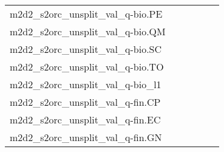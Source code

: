 {\begin{longtable}{m{6cm}m{1.7cm}m{1.7cm}m{1.7cm}m{1.7cm}m{1.7cm}}
	m2d2\_s2orc\_unsplit\_val\_q-bio.PE  & \colorbox[HTML]{bae294}{\makebox[\mywidth][c]{12.57}} & \colorbox[HTML]{dcf1a5}{\makebox[\mywidth][c]{12.71}} & \colorbox[HTML]{ffffe5}{\makebox[\mywidth][c]{14.62}} & \colorbox[HTML]{d7efa2}{\makebox[\mywidth][c]{12.69}} & \colorbox[HTML]{77c578}{\makebox[\mywidth][c]{12.41}}\\
	m2d2\_s2orc\_unsplit\_val\_q-bio.QM  & \colorbox[HTML]{a4d98a}{\makebox[\mywidth][c]{12.49}} & \colorbox[HTML]{ddf1a6}{\makebox[\mywidth][c]{12.69}} & \colorbox[HTML]{ffffe5}{\makebox[\mywidth][c]{14.44}} & \colorbox[HTML]{bbe395}{\makebox[\mywidth][c]{12.56}} & \colorbox[HTML]{77c578}{\makebox[\mywidth][c]{12.40}}\\
	m2d2\_s2orc\_unsplit\_val\_q-bio.SC  & \colorbox[HTML]{b8e293}{\makebox[\mywidth][c]{13.68}} & \colorbox[HTML]{e1f3a9}{\makebox[\mywidth][c]{13.85}} & \colorbox[HTML]{ffffe5}{\makebox[\mywidth][c]{15.60}} & \colorbox[HTML]{cdeb9d}{\makebox[\mywidth][c]{13.75}} & \colorbox[HTML]{77c578}{\makebox[\mywidth][c]{13.53}}\\
	m2d2\_s2orc\_unsplit\_val\_q-bio.TO  & \colorbox[HTML]{bde395}{\makebox[\mywidth][c]{13.49}} & \colorbox[HTML]{cae99c}{\makebox[\mywidth][c]{13.53}} & \colorbox[HTML]{ffffe5}{\makebox[\mywidth][c]{15.32}} & \colorbox[HTML]{bbe395}{\makebox[\mywidth][c]{13.48}} & \colorbox[HTML]{77c578}{\makebox[\mywidth][c]{13.33}}\\
	m2d2\_s2orc\_unsplit\_val\_q-bio\_l1  & \colorbox[HTML]{bfe596}{\makebox[\mywidth][c]{13.69}} & \colorbox[HTML]{e4f4ab}{\makebox[\mywidth][c]{13.87}} & \colorbox[HTML]{ffffe5}{\makebox[\mywidth][c]{15.75}} & \colorbox[HTML]{cdeb9d}{\makebox[\mywidth][c]{13.75}} & \colorbox[HTML]{77c578}{\makebox[\mywidth][c]{13.50}}\\
	m2d2\_s2orc\_unsplit\_val\_q-fin.CP  & \colorbox[HTML]{a2d889}{\makebox[\mywidth][c]{11.37}} & \colorbox[HTML]{e3f4aa}{\makebox[\mywidth][c]{11.61}} & \colorbox[HTML]{ffffe5}{\makebox[\mywidth][c]{13.36}} & \colorbox[HTML]{b2df90}{\makebox[\mywidth][c]{11.41}} & \colorbox[HTML]{77c578}{\makebox[\mywidth][c]{11.28}}\\
	m2d2\_s2orc\_unsplit\_val\_q-fin.EC  & \colorbox[HTML]{9fd688}{\makebox[\mywidth][c]{11.72}} & \colorbox[HTML]{d5eea1}{\makebox[\mywidth][c]{11.89}} & \colorbox[HTML]{ffffe5}{\makebox[\mywidth][c]{13.77}} & \colorbox[HTML]{b4e091}{\makebox[\mywidth][c]{11.77}} & \colorbox[HTML]{77c578}{\makebox[\mywidth][c]{11.63}}\\
	m2d2\_s2orc\_unsplit\_val\_q-fin.GN  & \colorbox[HTML]{bfe596}{\makebox[\mywidth][c]{13.79}} & \colorbox[HTML]{ddf1a6}{\makebox[\mywidth][c]{13.91}} & \colorbox[HTML]{ffffe5}{\makebox[\mywidth][c]{15.73}} & \colorbox[HTML]{cdeb9d}{\makebox[\mywidth][c]{13.83}} & \colorbox[HTML]{77c578}{\makebox[\mywidth][c]{13.61}}\\

\end{longtable}}
